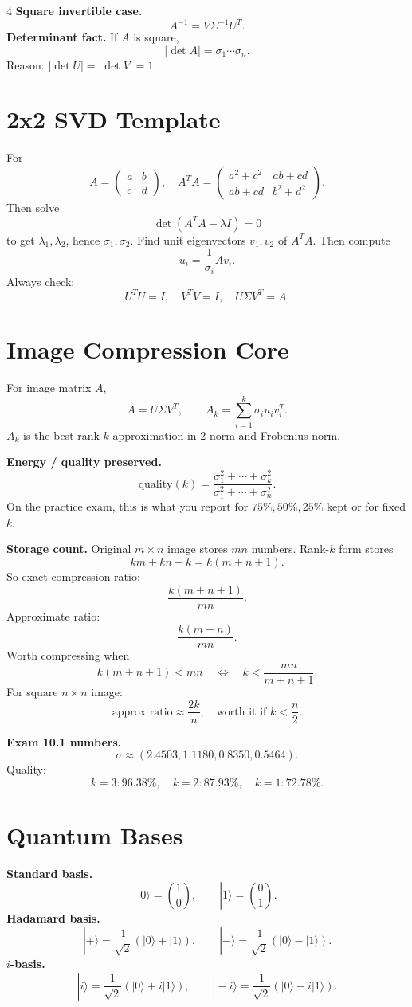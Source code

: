 \documentclass[letterpaper]{article}
\newcommand{\ket}[1]{|#1\rangle}
\newcommand{\smallhead}[1]{{\bfseries #1}}
\begin{document}
\begin{multicols*}{4}
\smallhead{Square invertible case.}
\[
A^{-1}=V\Sigma^{-1}U^T.
\]
\smallhead{Determinant fact.} If $A$ is square,
\[
|\det A|=\sigma_1\cdots \sigma_n.
\]
Reason: $|\det U|=|\det V|=1$.

\section{2x2 SVD Template}
For
\[
A=\begin{pmatrix}a&b\\c&d\end{pmatrix},
\quad
A^TA=\begin{pmatrix}a^2+c^2&ab+cd\\ab+cd&b^2+d^2\end{pmatrix}.
\]
Then solve
\[
\det(A^TA-\lambda I)=0
\]
to get $\lambda_1,\lambda_2$, hence $\sigma_1,\sigma_2$. Find unit eigenvectors $v_1,v_2$ of $A^TA$. Then compute
\[
u_i=\frac{1}{\sigma_i}Av_i.
\]
Always check:
\[
U^TU=I,\quad V^TV=I,\quad U\Sigma V^T=A.
\]

\section{Image Compression Core}
For image matrix $A$,
\[
A=U\Sigma V^T,\qquad
A_k=\sum_{i=1}^k \sigma_i u_i v_i^T.
\]
$A_k$ is the best rank-$k$ approximation in 2-norm and Frobenius norm.

\smallhead{Energy / quality preserved.}
\[
\text{quality}(k)=\frac{\sigma_1^2+\cdots+\sigma_k^2}{\sigma_1^2+\cdots+\sigma_n^2}.
\]
On the practice exam, this is what you report for $75\%,50\%,25\%$ kept or for fixed $k$.

\smallhead{Storage count.} Original $m\times n$ image stores $mn$ numbers. Rank-$k$ form stores
\[
km+kn+k=k(m+n+1).
\]
So exact compression ratio:
\[
\frac{k(m+n+1)}{mn}.
\]
Approximate ratio:
\[
\frac{k(m+n)}{mn}.
\]
Worth compressing when
\[
k(m+n+1)<mn
\quad\Leftrightarrow\quad
k<\frac{mn}{m+n+1}.
\]
For square $n\times n$ image:
\[
\text{approx ratio}\approx \frac{2k}{n},\quad
\text{worth it if }k<\frac n2.
\]

\smallhead{Exam 10.1 numbers.}
\[
\sigma \approx (2.4503,1.1180,0.8350,0.5464).
\]
Quality:
\[
k=3:96.38\%,\quad k=2:87.93\%,\quad k=1:72.78\%.
\]

\columnbreak
\section{Quantum Bases}
\smallhead{Standard basis.}
\[
\ket{0}=\binom10,\qquad \ket{1}=\binom01.
\]
\smallhead{Hadamard basis.}
\[
\ket{+}=\frac{1}{\sqrt2}(\ket0+\ket1),\qquad
\ket{-}=\frac{1}{\sqrt2}(\ket0-\ket1).
\]
\smallhead{$i$-basis.}
\[
\ket{i}=\frac{1}{\sqrt2}(\ket0+i\ket1),\qquad
\ket{-i}=\frac{1}{\sqrt2}(\ket0-i\ket1).
\]


\end{multicols*}
\end{document}
